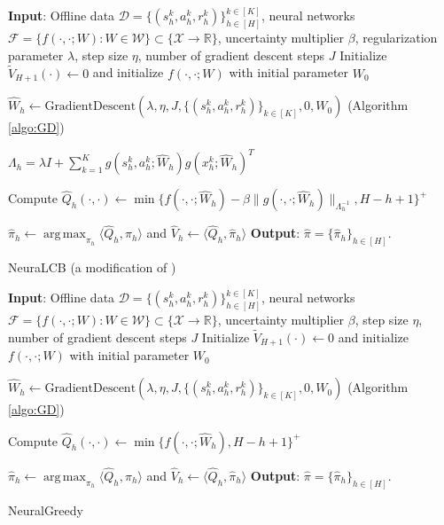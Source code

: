 \documentclass{article} \usepackage{iclr2023/iclr2023_conference,times}
\DeclareMathOperator*{\argmax}{arg\,max}
\begin{document}
\begin{algorithm}[h]
\begin{algorithmic}[1]
\State \textbf{Input}: Offline data $ \mathcal{D} = \{(s_h^k, a_h^k, r_h^k)\}_{h \in [H]}^{k \in [K]} $, neural networks $\mathcal{F} = \{f(\cdot, \cdot; W): W \in \mathcal{W}\} \subset \{\mathcal{X} \rightarrow \mathbb{R}\}$, uncertainty multiplier $\beta$, regularization parameter $\lambda$, step size $\eta$, number of gradient descent steps $J$  
\State Initialize $\tilde{V}_{H+1}(\cdot) \leftarrow 0$ and initialize $f(\cdot, \cdot; W)$ with initial parameter $W_0$


\State $\hat{W}_h \leftarrow \textrm{GradientDescent}(\lambda, \eta, J, \{(s_h^k, a_h^k, r_h^k)\}_{k \in [K]}, 0, W_0)$ (Algorithm \ref{algo:GD})


\State $\Lambda_h = \lambda I + \sum_{k=1}^K g(s^k_h, a^k_h; \hat{W}_h) g(x^k_h; \hat{W}_h)^T$



\State Compute $\hat{Q}_h(\cdot, \cdot) \leftarrow \min \{ f(\cdot, \cdot; \hat{W}_h) - \beta \| g(\cdot, \cdot; \hat{W}_h) \|_{\Lambda_h^{-1}}, H - h +1  \}^{+}$






\State $\hat{\pi}_{h} \leftarrow \argmax_{\pi_{h}}\langle \hat{Q}_{h}, \pi_{h} \rangle$ and $\hat{V}_h \leftarrow \langle \hat{Q}_{h}, \hat{\pi}_{h} \rangle$
\EndFor
\State \textbf{Output}: $\hat{\pi} = \{ \hat{\pi}_h \}_{h \in [H]}$.
\end{algorithmic}
\caption{NeuraLCB (a modification of \citep{nguyen2021offline})}
\label{algorithm: NeuraLCB}
\end{algorithm}


\begin{algorithm}
\begin{algorithmic}[1]
\State \textbf{Input}: Offline data $ \mathcal{D} = \{(s_h^k, a_h^k, r_h^k)\}_{h \in [H]}^{k \in [K]} $, neural networks $\mathcal{F} = \{f(\cdot, \cdot; W): W \in \mathcal{W}\} \subset \{\mathcal{X} \rightarrow \mathbb{R}\}$, uncertainty multiplier $\beta$, step size $\eta$, number of gradient descent steps $J$  
\State Initialize $\tilde{V}_{H+1}(\cdot) \leftarrow 0$ and initialize $f(\cdot, \cdot; W)$ with initial parameter $W_0$


\State $\hat{W}_h \leftarrow \textrm{GradientDescent}(\lambda, \eta, J, \{(s_h^k, a_h^k, r_h^k)\}_{k \in [K]}, 0, W_0)$ (Algorithm \ref{algo:GD})






\State Compute $\hat{Q}_h(\cdot, \cdot) \leftarrow \min \{ f(\cdot, \cdot; \hat{W}_h), H - h +1  \}^{+}$






\State $\hat{\pi}_{h} \leftarrow \argmax_{\pi_{h}}\langle \hat{Q}_{h}, \pi_{h} \rangle$ and $\hat{V}_h \leftarrow \langle \hat{Q}_{h}, \hat{\pi}_{h} \rangle$
\EndFor
\State \textbf{Output}: $\hat{\pi} = \{ \hat{\pi}_h \}_{h \in [H]}$.
\end{algorithmic}
\caption{NeuralGreedy}
\label{algorithm: NeuralGreedy}
\end{algorithm}

 
\end{document}

